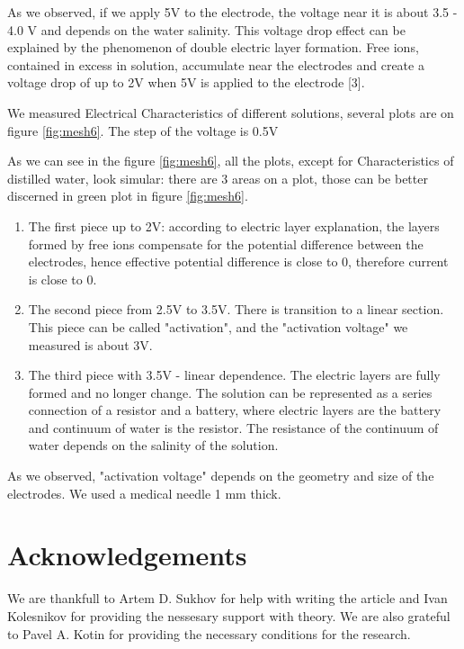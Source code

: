 \documentclass{article}
\begin{document}
As we observed, if we apply 5V to the electrode, the voltage near it is about 3.5 - 4.0 V and depends on the water salinity. This voltage drop effect can be explained by the phenomenon of double electric layer formation. Free ions, contained in excess in solution, accumulate near the electrodes and create a voltage drop of up to 2V when 5V is applied to the electrode [3].\par

We measured Electrical Characteristics of different solutions, several plots are on figure \ref{fig:mesh6}. The step of the voltage is 0.5V 




As we can see in the figure \ref{fig:mesh6}, all the plots, except for Characteristics of distilled water, look simular: there are 3 areas on a plot, those can be better discerned in green plot in figure \ref{fig:mesh6}. 

\begin{enumerate}
\item The first piece up to 2V: according to electric layer explanation, the layers formed by free ions compensate for the potential difference between the electrodes, hence effective potential difference is close to 0, therefore current is close to 0.

\item The second piece from 2.5V to 3.5V. There is transition to a linear section. This piece can be called "activation", and the "activation voltage" we measured is about 3V.

\item The third piece with 3.5V - linear dependence. The electric layers are fully formed and no longer change. The solution can be represented as a series connection of a resistor and a battery, where electric layers are the battery and continuum of water is the resistor. The resistance of the continuum of water depends on the salinity of the solution.
\end{enumerate}

As we observed, "activation voltage" depends on the geometry and size of the electrodes. We used a medical needle 1 mm thick.


\section{Acknowledgements}
We are thankfull to Artem D. Sukhov for help with writing the article and Ivan Kolesnikov for providing the nessesary support with theory. We are also grateful to Pavel A. Kotin for providing the necessary conditions for the research.
\end{document}
